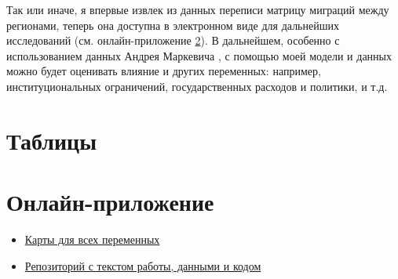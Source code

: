 \documentclass[a4paper,12pt]{article}
\let\oldsection\section
\renewcommand\section{\clearpage\oldsection}
\begin{document}
Так или иначе, я впервые извлек из данных переписи матрицу миграций между регионами, теперь она доступна в электронном виде для дальнейших исследований (см. онлайн-приложение \ref{app:online}). В дальнейшем, особенно с использованием данных Андрея Маркевича \citeyear{markevich_regional_2019}, с помощью моей модели и данных можно будет оценивать влияние и других переменных: например, институциональных ограничений, государственных расходов и политики, и т.д.

\clearpage\printbibliography


\clearpage\appendix


\section{Таблицы}






\oldsection{Онлайн-приложение}\label{app:online}

\begin{itemize}
	\item 
	\href{https://russia-migrations-1897.herokuapp.com}{Карты для всех переменных}
	\item \href{https://github.com/fant0md/empire-migrations-coursework}{Репозиторий с текстом работы, данными и кодом}
\end{itemize}
\end{document}
